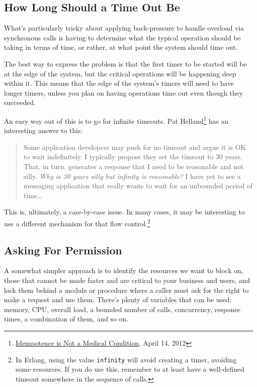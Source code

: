 \documentclass[11pt, oneside]{book}   	%
\newcommand{\term}[1]{\Verb`#1`}
\begin{document}
\subsection{How Long Should a Time Out Be}

What's particularly tricky about applying back-pressure to handle overload via synchronous calls is having to determine what the typical operation should be taking in terms of time, or rather, at what point the system should time out.

The best way to express the problem is that the first timer to be started will be at the edge of the system, but the critical operations will be happening deep within it. This means that the edge of the system's timers will need to have longer timers, unless you plan on having operations time out even though they succeeded.

An easy way out of this is to go for infinite timeouts. Pat Helland\footnote{\href{http://queue.acm.org/detail.cfm?id=2187821}{Idempotence is Not a Medical Condition}, April 14, 2012} has an interesting answer to this:

\begin{quote}
Some application developers may push for no timeout and argue it is OK to wait indefinitely. I typically propose they set the timeout to 30 years. That, in turn, generates a response that I need to be reasonable and not silly. \emph{Why is 30 years silly but infinity is reasonable?} I have yet to see a messaging application that really wants to wait for an unbounded period of time…
\end{quote}

This is, ultimately, a case-by-case issue. In many cases, it may be interesting to use a different mechanism for that flow control.\footnote{In Erlang, using the value \term{infinity} will avoid creating a timer, avoiding some resources. If you do use this, remember to at least have a well-defined timeout somewhere in the sequence of calls.}

\subsection{Asking For Permission}

A somewhat simpler approach is to identify the resources we want to block on, those that cannot be made faster and are critical to your business and users, and lock them behind a module or procedure where a caller must ask for the right to make a request and use them. There's plenty of variables that can be used: memory, CPU, overall load, a bounded number of calls, concurrency, response times, a combination of them, and so on.
\end{document}
